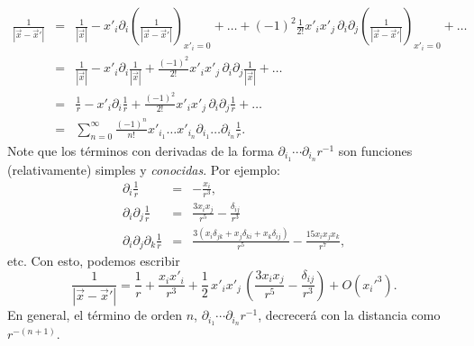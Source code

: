 \begin{eqnarray}
\frac{1}{\left|\vec{x}-\vec{x}'\right|}
&=&\frac{1}{\left|\vec{x}\right|}
-x'_i\partial_i\left(\frac{1}{\left|\vec{x}-\vec{x}'\right|} \right)
_{x'_i=0}+\dots+(-1)^2\frac{1}{2!}x'_ix'_j\,
\partial_i\partial_j\left(\frac{1} { \left|\vec{x}-\vec{x}
'\right|} \right) _{x'_i=0}+\dots \\
&=&\frac{1}{\left|\vec{x}\right|}-x'_i\partial_i\frac{1}{\left|\vec{x}\right|}
 +\frac{(-1)^2}{2!}x'_ix'_j\,\partial_i\partial_j\frac{1}{\left|\vec{x}\right|}
+\dots \\
&=&\frac{1}{r}-x'_i\partial_i\frac{1}{r}+\frac{(-1)^2}{2!}x'_ix'_j\,
\partial_i\partial_j\frac{1}{r} +\dots \\
&=&\sum_{n=0}^\infty\frac{(-1)^n}{n!}x'_{i_1}\dots x'_{i_n}\partial_{i_1}\dots
\partial_{i_n}\frac{1}{r} .\label{exp1or}
\end{eqnarray}
Note que los términos con derivadas de la forma $\partial_{i_1}\cdots
\partial_{i_n}r^{-1}$ son funciones (relativamente) simples y \textit{conocidas}.
Por ejemplo:
\begin{eqnarray}
\partial_i\frac{1}{r}&=&-\frac{x_i}{r^3}, \\
\partial_i\partial_j\frac{1}{r}
&=& \frac{3x_ix_j}{r^5}-\frac{\delta_{ij}}{r^3} \\
\partial_i\partial_j\partial_k\frac{1}{r}
&=& \frac{3\left(x_i\delta_{jk}+x_j\delta_{ki}+x_k\delta_{ij}\right)}{r^5}
-\frac{15x_ix_jx_k}{r^7},
\end{eqnarray}
etc. Con esto, podemos escribir
\begin{equation} \label{eq3.2.3}
\frac{1}{|\vec{x}-\vec{x}'|}=\frac{1}{r}+\frac{x_ix'_i}{r^3}
+\frac{1}{2}\,x'_ix'_j\,\left(\frac{3x_ix_j}{r^5}-\frac{\delta_{ij}}{
r^3}\right)+O\left(x_i'^3\right).
\end{equation}
En general, el término de orden $n$, $\partial_{i_1}\cdots
\partial_{i_n}r^{-1}$, decrecerá con la distancia como $r^{-(n+1)}$.

